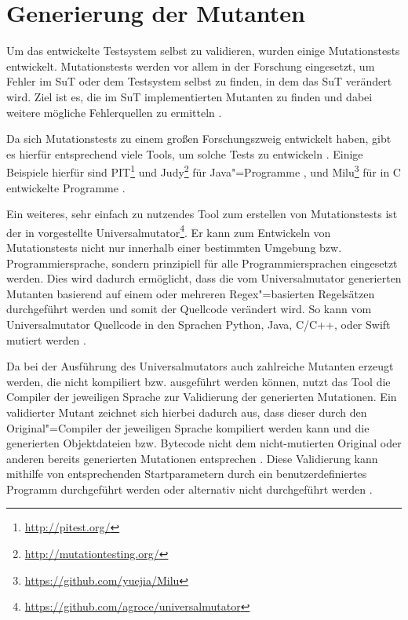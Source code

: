 \section{Generierung der Mutanten}
\label{sec:implMutationTests}

Um das entwickelte Testsystem selbst zu validieren, wurden einige \glspl{Mutationstest} entwickelt.
Mutationstests werden vor allem in der Forschung eingesetzt, um Fehler im \gls{SuT} oder dem Testsystem selbst zu finden, in dem das \gls{SuT} verändert wird.
Ziel ist es, die im \gls{SuT} implementierten Mutanten zu finden und dabei weitere mögliche Fehlerquellen zu ermitteln \cite{DeMillo1978,Hamlet1977,Jia2011,Groce2018}.

Da sich \glspl{Mutationstest} zu einem großen Forschungszweig entwickelt haben, gibt es hierfür entsprechend viele Tools, um solche Tests zu entwickeln \cite{Jia2011,Groce2018}.
Einige Beispiele hierfür sind PIT\footnote{\url{http://pitest.org/}} und Judy\footnote{\url{http://mutationtesting.org/}} für Java"=Programme \cite{Coles2016,Madeyski2010}, und Milu\footnote{\url{https://github.com/yuejia/Milu}} für in C entwickelte Programme \cite{Jia2008}.

Ein weiteres, sehr einfach zu nutzendes Tool zum erstellen von \glspl{Mutationstest} ist der in \cite{Groce2018} vorgestellte Universalmutator\footnote{\url{https://github.com/agroce/universalmutator}}.
Er kann zum Entwickeln von \glspl{Mutationstest} nicht nur innerhalb einer bestimmten Umgebung bzw. Programmiersprache, sondern prinzipiell für alle Programmiersprachen eingesetzt werden.
Dies wird dadurch ermöglicht, dass die vom Universalmutator generierten Mutanten basierend auf einem oder mehreren \gls{Regex}"=basierten Regelsätzen durchgeführt werden und somit der Quellcode verändert wird.
So kann vom Universalmutator Quellcode \uA in den Sprachen Python, Java, C/C++, oder Swift mutiert werden \cite{Groce2018}.

Da bei der Ausführung des Universalmutators auch zahlreiche Mutanten erzeugt werden, die nicht kompiliert bzw. ausgeführt werden können, nutzt das Tool die Compiler der jeweiligen Sprache zur Validierung der generierten Mutationen.
Ein validierter Mutant zeichnet sich hierbei dadurch aus, dass dieser durch den Original"=Compiler der jeweiligen Sprache kompiliert werden kann und die generierten Objektdateien bzw. Bytecode nicht dem nicht-mutierten Original oder anderen bereits generierten Mutationen entsprechen \cite{Groce2018}.
Diese Validierung kann mithilfe von entsprechenden Startparametern durch ein benutzerdefiniertes Programm durchgeführt werden oder alternativ nicht durchgeführt werden \cite{Groce2018,UniversalmutatorSourceGenmutants}.

